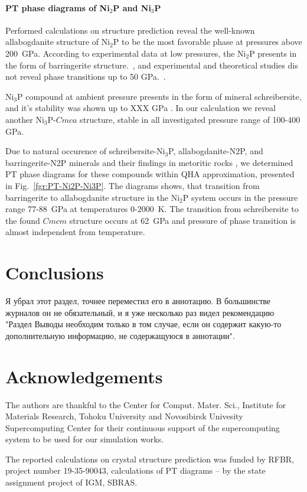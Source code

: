 \documentclass[twoside,twocolumn,9pt]{article}
\begin{document}
\paragraph{PT phase diagrams of Ni$_2$P and Ni$_3$P} 

Performed calculations on structure prediction reveal the well-known allabogdanite structure of Ni$_2$P to be the most favorable phase at pressures above 200~GPa. 
According to experimental data at low pressures, the Ni$_2$P presents in the form of barringerite structure.~\cite{Buseck1969}, and experimental and theoretical studies dis not reveal phase transitions up to 50 GPa.~\cite{Dera-2009-JGR,Nisar-2010-EPSL}.

Ni$_3$P compound at ambient pressure presents in the form of mineral schreibersite, and it's stability was shown up to XXX GPa \cite{skala_m-2003}.
In our calculation we reveal another Ni$_3$P-$Cmca$ structure, stable in all investigated pressure range of 100-400 GPa. 

Due to natural occurence of schreibersite-Ni$_3$P, allabogdanite-N2P, and barringerite-N2P minerals and their findings in metoritic rocks \cite{}, we determined PT phase diagrams for these compounds within QHA approximation, presented in Fig.~\ref{fgr:PT-Ni2P-Ni3P}. 
The diagrams shows, that transition from barringerite to allabogdanite structure in the Ni$_2$P system occurs in the pressure range 77-88~GPa at temperatures 0-2000~K.
The transition from schreibersite to the found $Cmcm$ structure occurs at 62~GPa and pressure of phase transition is almost independent from temperature.


\section{Conclusions}
{\color{red}Я убрал этот раздел, точнее переместил его в аннотацию. В большинстве журналов он не обязательный, и я уже несколько раз видел рекомендацию "Раздел Выводы необходим только в том случае, если он содержит какую-то дополнительную информацию, не содержащуюся в аннотации". }

\section*{Acknowledgements}

The authors are thankful to the Center for Comput. Mater. Sci., Institute for Materials Research, Tohoku University and Novosibirsk Univesity Supercomputing Center for their continuous support of the supercomputing system to be used for our simulation works. 

The reported calculations on crystal structure prediction was funded by RFBR, project number 19-35-90043, calculations of PT diagrams – by the state assignment project of IGM, SBRAS.

\balance
\end{document}
